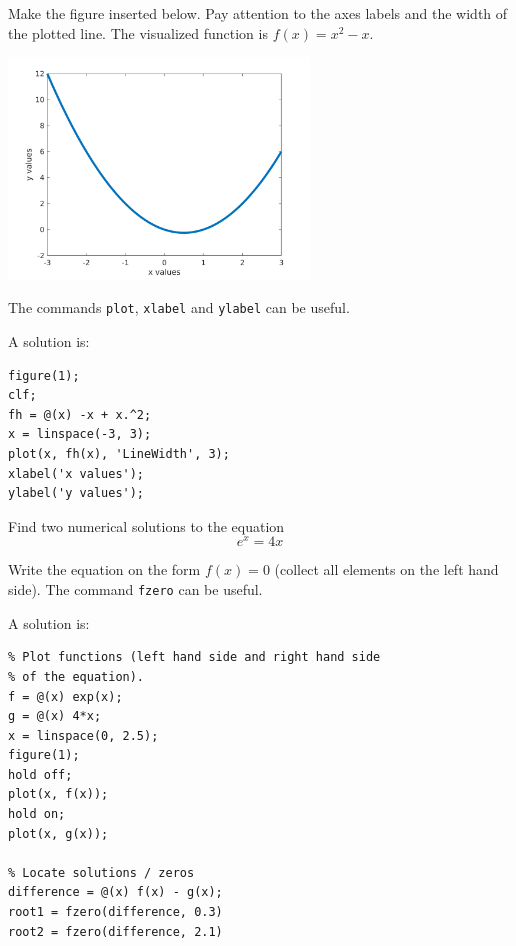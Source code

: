 \begin{ex}
Make the figure inserted below. Pay attention to the axes labels and the width of the plotted line. The visualized function is $f(x) = x^2 - x$. \par
\noindent
\includegraphics[width=8cm]{pic/basic_plotting_020.png}
\begin{hint}
The commands \verb!plot!, \verb!xlabel! and \verb!ylabel! can be useful.
\end{hint}
\begin{sol}
A solution is:
\begin{verbatim}
figure(1);
clf;
fh = @(x) -x + x.^2;
x = linspace(-3, 3);
plot(x, fh(x), 'LineWidth', 3);
xlabel('x values');
ylabel('y values');
\end{verbatim}
\end{sol}
\end{ex}


\begin{ex}
Find two numerical solutions to the equation
\[
e^{x} = 4x
\]
\begin{hint}
Write the equation on the form $f(x) = 0$ (collect all elements on the left hand side).
The command \verb!fzero! can be useful.
\end{hint}
\begin{sol}
A solution is:
\begin{verbatim}
% Plot functions (left hand side and right hand side 
% of the equation).
f = @(x) exp(x);
g = @(x) 4*x;
x = linspace(0, 2.5);
figure(1);
hold off;
plot(x, f(x));
hold on;
plot(x, g(x));

% Locate solutions / zeros
difference = @(x) f(x) - g(x);
root1 = fzero(difference, 0.3)
root2 = fzero(difference, 2.1)
\end{verbatim}
\end{sol}
\end{ex}



